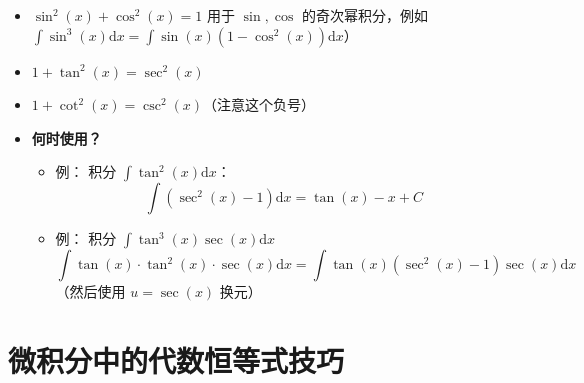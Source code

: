 \documentclass[lang=cn,math=mtpro2,11pt,scheme=chinese]{elegantbook}
\begin{document}
\begin{itemize}
  \item $\sin^2(x) + \cos^2(x) = 1$ 用于 $\sin, \cos$ 的奇次幂积分，例如 $\int \sin^3(x) \mathrm{d}x = \int \sin(x)(1-\cos^2(x)) \mathrm{d}x$）
  \item $1 + \tan^2(x) = \sec^2(x)$
  \item $1 + \cot^2(x) = \csc^2(x)$（注意这个负号）
  \item \textbf{何时使用？}
  \begin{itemize}
    \item 例： 积分 $\int \tan^2(x) \mathrm{d}x$：
    \[
    \int (\sec^2(x) - 1) \mathrm{d}x = \tan(x) - x + C
    \]
    \item 例： 积分 $\int \tan^3(x)\sec(x) \mathrm{d}x$
    \[
    \int \tan(x) \cdot \tan^2(x) \cdot \sec(x) \mathrm{d}x = \int \tan(x) (\sec^2(x) - 1) \sec(x) \mathrm{d}x
    \]
    （然后使用 $u = \sec(x)$ 换元）
  \end{itemize}
\end{itemize}
\vspace{3em}


\section{微积分中的代数恒等式技巧}
\end{document}
